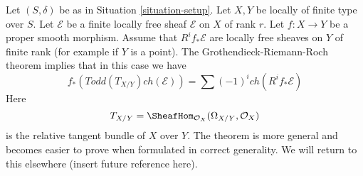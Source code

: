 \noindent
Let $(S, \delta)$ be as in
Situation \ref{situation-setup}.
Let $X, Y$ be locally of finite type over $S$.
Let $\mathcal{E}$ be a finite locally free sheaf
${\mathcal E}$ on $X$ of rank $r$.
Let $f : X \to Y$ be a proper smooth morphism.
Assume that $R^if_*\mathcal{E}$ are locally free
sheaves on $Y$ of finite rank (for example if $Y$ is a point).
The Grothendieck-Riemann-Roch theorem implies that in this
case we have
$$
f_*(Todd(T_{X/Y}) ch(\mathcal{E}))
=
\sum (-1)^i ch(R^if_*\mathcal{E})
$$
Here
$$
T_{X/Y} = \SheafHom_{\mathcal{O}_X}(\Omega_{X/Y}, \mathcal{O}_X)
$$
is the relative tangent bundle of $X$ over $Y$.
The theorem is more general and becomes easier to prove
when formulated in correct generality. We will return to
this elsewhere (insert future reference here).















